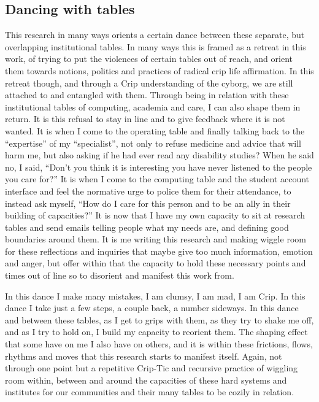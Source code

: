 \hypertarget{dancing-with-tables}{%
\subsection[Dancing with
tables]{\texorpdfstring{\protect\hypertarget{anchor}{}{}Dancing with
tables}{Dancing with tables}}\label{dancing-with-tables}}

This research in many ways orients a certain dance between these
separate, but overlapping institutional tables. In many ways this is
framed as a retreat in this work, of trying to put the violences of
certain tables out of reach, and orient them towards notions, politics
and practices of radical crip life affirmation. In this retreat though,
and through a Crip understanding of the cyborg, we are still attached to
and entangled with them. Through being in relation with these
institutional tables of computing, academia and care, I can also shape
them in return. It is this refusal to stay in line and to give feedback
where it is not wanted. It is when I come to the operating table and
finally talking back to the ``expertise'' of my ``specialist'', not only
to refuse medicine and advice that will harm me, but also asking if he
had ever read any disability studies? When he said no, I said, ``Don't
you think it is interesting you have never listened to the people you
care for?'' It is when I come to the computing table and the student
account interface and feel the normative urge to police them for their
attendance, to instead ask myself, ``How do I care for this person and
to be an ally in their building of capacities?'' It is now that I have
my own capacity to sit at research tables and send emails telling people
what my needs are, and defining good boundaries around them. It is me
writing this research and making wiggle room for these reflections and
inquiries that maybe give too much information, emotion and anger, but
offer within that the capacity to hold these necessary points and times
out of line so to disorient and manifest this work from.

In this dance I make many mistakes, I am clumsy, I am mad, I am Crip. In
this dance I take just a few steps, a couple back, a number sideways. In
this dance and between these tables, as I get to grips with them, as
they try to shake me off, and as I try to hold on, I build my capacity
to reorient them. The shaping effect that some have on me I also have on
others, and it is within these frictions, flows, rhythms and moves that
this research starts to manifest itself. Again, not through one point
but a repetitive Crip-Tic and recursive practice of wiggling room
within, between and around the capacities of these hard systems and
institutes for our communities and their many tables to be cozily in
relation.
